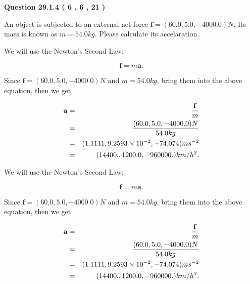 \documentclass[12pt]{article}
\begin{document}
   
  
\vspace{0.2in}
  
{\textbf{\Large{Question
29.1.4 
 (           6 ,           6 ,          21 )
}}}
  
  
 
An object is subjected to an external net force $\mathbf{f}=(
60.0,  %
5.0,
-4000.0  )N$. Its mass is known as
$m= %
54.0 kg$. Please calculate its accelaration.
 
 
 
 
\noindent{}
 
 

We will use the Newton's Second Law:
 
\[
\mathbf{f}=m\mathbf{a}.
\]
 
Since $\mathbf{f}=( %
60.0,  %
5.0,  %
-4000.0 )N$
and $m= %
54.0 kg$, bring them into the above equation, then we get
 
\begin{eqnarray*}
\mathbf{a}&=&\frac{\mathbf{f}}m  \\
&=&\frac{(
60.0 ,
5.0 ,
-4000.0 )N
}{ %
54.0 kg}  \\
&=&(
1.1111 ,
9.2593 \times 10^{-2},
-74.074
)ms^{-2} \\
&=&(
14400. ,
1200.0 ,
-960000.
)km/h^2.
\end{eqnarray*}
 
 
 
\noindent{}
 
 

 
 
 
\noindent{}
 
 

We will use the Newton's Second Law:
 
\[
\mathbf{f}=m\mathbf{a}.
\]
 
Since $\mathbf{f}=( %
60.0,  %
5.0,  %
-4000.0 )N$
and $m= %
54.0 kg$, bring them into the above equation, then we get
 
\begin{eqnarray*}
\mathbf{a}&=&\frac{\mathbf{f}}m  \\
&=&\frac{(
60.0 ,
5.0 ,
-4000.0 )N
}{ %
54.0 kg}  \\
&=&(
1.1111 ,
9.2593 \times 10^{-2},
-74.074
)ms^{-2} \\
&=&(
14400. ,
1200.0 ,
-960000.
)km/h^2.
\end{eqnarray*}
 
\end{document}
